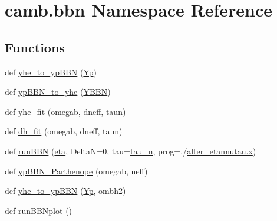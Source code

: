 \hypertarget{namespacecamb_1_1bbn}{}\section{camb.\+bbn Namespace Reference}
\label{namespacecamb_1_1bbn}
\subsection*{Functions}
\begin{DoxyCompactItemize}
\item 
def \mbox{\hyperlink{namespacecamb_1_1bbn_a114f83bb5e17fd586485de562d04035e}{yhe\+\_\+to\+\_\+yp\+B\+BN}} (\mbox{\hyperlink{namespacecamb_1_1bbn_a64a4ad2532dcfaa25d7048a3f3f2992e}{Yp}})
\item 
def \mbox{\hyperlink{namespacecamb_1_1bbn_a9919c33355b5bbeee07634a0aa957b9a}{yp\+B\+B\+N\+\_\+to\+\_\+yhe}} (\mbox{\hyperlink{namespacecamb_1_1bbn_ab3d92f46f19b0025c2d5c6e26522b30c}{Y\+B\+BN}})
\item 
def \mbox{\hyperlink{namespacecamb_1_1bbn_ab4f0838cbe3e4c575ff31eaec11126c7}{yhe\+\_\+fit}} (omegab, dneff, taun)
\item 
def \mbox{\hyperlink{namespacecamb_1_1bbn_a631c65a5e52fd772fd227d7017dccf34}{dh\+\_\+fit}} (omegab, dneff, taun)
\item 
def \mbox{\hyperlink{namespacecamb_1_1bbn_ae39e69c7217dc7635429e776f01fde55}{run\+B\+BN}} (\mbox{\hyperlink{namespacecamb_1_1bbn_acbc137606c793f20e1ded220bbfab367}{eta}}, DeltaN=0, tau=\mbox{\hyperlink{namespacecamb_1_1bbn_ae95abe1177100ca3b8cfb59cf9e379be}{tau\+\_\+n}}, prog=\textquotesingle{}./\mbox{\hyperlink{plotTT_8m_a9336ebf25087d91c818ee6e9ec29f8c1}{alter\+\_\+etannutau.\+x}}\textquotesingle{})
\item 
def \mbox{\hyperlink{namespacecamb_1_1bbn_ad29937c86c274eada16f48fc3c2e3727}{yp\+B\+B\+N\+\_\+\+Parthenope}} (omegab, neff)
\item 
def \mbox{\hyperlink{namespacecamb_1_1bbn_a0fba7f6a46bfb06711a39350bcfe238f}{yhe\+\_\+to\+\_\+yp\+B\+BN}} (\mbox{\hyperlink{namespacecamb_1_1bbn_a64a4ad2532dcfaa25d7048a3f3f2992e}{Yp}}, ombh2)
\item 
def \mbox{\hyperlink{namespacecamb_1_1bbn_ab478fa803bc42b27cc92d291785174c5}{run\+B\+B\+Nplot}} ()
\end{DoxyCompactItemize}
